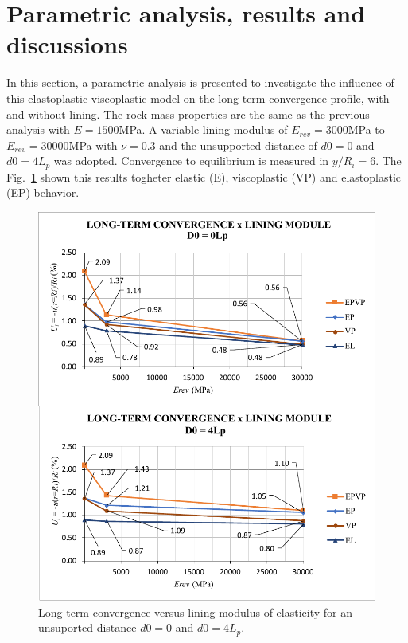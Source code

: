 \documentclass[Journal,letterpaper]{ascelike-new}
\begin{document}
\section{Parametric analysis, results and discussions}

In this section, a parametric analysis is presented to investigate the influence of this elastoplastic-viscoplastic model on the long-term convergence profile, with and without lining. The rock mass properties are the same as the previous analysis with $E=1500$MPa. A variable lining modulus of $E_{rev} = 3000$MPa to $E_{rev} = 30000$MPa with $\nu = 0.3$ and the unsupported distance of $d0 = 0$ and $d0 = 4L_p$ was adopted. Convergence to equilibrium is measured in $y/R_i = 6$. The Fig.~\ref{convergence_lining_module} shown this results togheter elastic (E), viscoplastic (VP) and elastoplastic (EP) behavior.

\begin{figure}
	\centering
	\includegraphics[scale = 1.0]{convergence_lining_module.pdf}
	\caption{\label{convergence_lining_module}Long-term convergence versus lining modulus of elasticity for an unsuported distance $d0=0$ and $d0=4L_p$.}
\end{figure}
\end{document}
